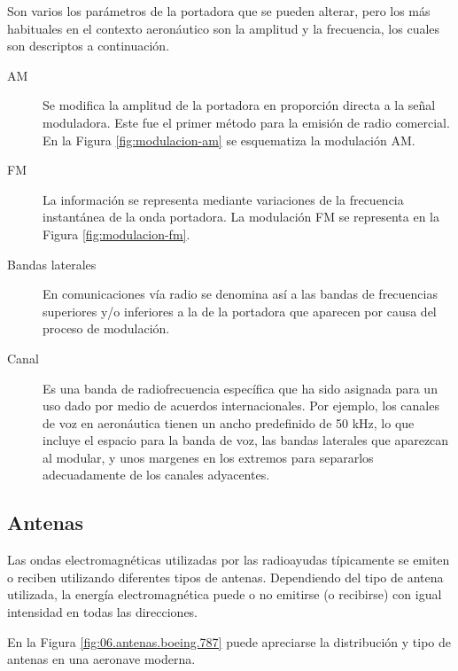 Son varios los par\'ametros de la portadora que se pueden alterar, pero los m\'as habituales en el contexto aeron\'autico son la amplitud y la frecuencia, los cuales son descriptos a continuaci\'on.

\begin{description}

\item [AM] Se modifica la amplitud de la portadora en proporci\'on directa a la se\~nal moduladora. Este fue el primer m\'etodo para la emisi\'on de radio comercial. En la Figura \ref{fig:modulacion-am} se esquematiza la modulaci\'on AM.


\item [FM]La informaci\'on se representa mediante variaciones de la frecuencia instant\'anea de la onda portadora.
La modulaci\'on FM se representa en la Figura \ref{fig:modulacion-fm}.


\item [Bandas laterales] En comunicaciones v\'ia radio se denomina as\'i a las bandas de frecuencias su\-pe\-rio\-res y/o inferiores a la de la portadora que aparecen por causa del proceso de modulaci\'on.


\item [Canal] Es una banda de radiofrecuencia espec\'ifica que ha sido asignada para un uso dado por medio de acuerdos internacionales. Por ejemplo, los canales de voz en aeron\'autica tienen un ancho predefinido de 50 kHz, lo que incluye el espacio para la banda de voz, las bandas laterales que aparezcan al modular, y unos margenes en los extremos para separarlos adecuadamente de los canales adyacentes.  

\end{description}






\subsection{Antenas}
\label{sec:06.Antenas}

Las ondas electromagn\'eticas
  utilizadas por las radioayudas t\'ipicamente se emiten o reciben
  utilizando diferentes tipos de antenas. Dependiendo del tipo de
  antena utilizada, la energ\'ia electromagn\'etica puede o no
  emitirse (o recibirse) con igual intensidad en todas las
  direcciones.
  
En la Figura \ref{fig:06.antenas.boeing.787} puede apreciarse la distribuci\'on y tipo de antenas en una aeronave 
moderna.


